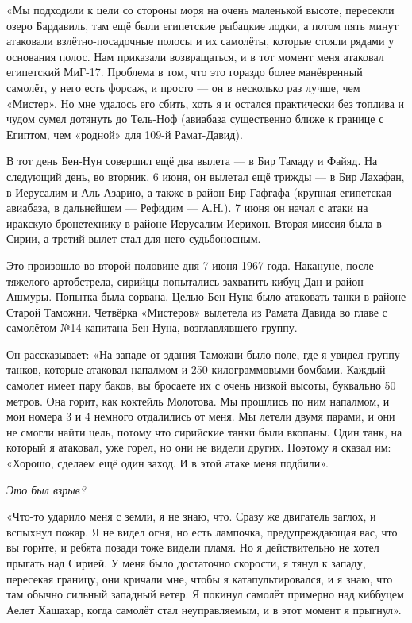 «Мы подходили к цели со стороны моря на очень маленькой высоте, пересекли озеро Бардавиль, там ещё были египетские рыбацкие лодки, а потом пять минут атаковали взлётно-посадочные полосы и их самолёты, которые стояли рядами у основания полос. Нам приказали возвращаться, и в тот момент меня атаковал египетский МиГ-17. Проблема в том, что это гораздо более манёвренный самолёт, у него есть форсаж, и просто — он в несколько раз лучше, чем «Мистер». Но мне удалось его сбить, хоть я и остался практически без топлива и чудом сумел дотянуть до Тель-Ноф (авиабаза существенно ближе к границе с Египтом, чем «родной» для 109-й Рамат-Давид).

В тот день Бен-Нун совершил ещё два вылета — в Бир Тамаду и Файяд. На следующий день, во вторник, 6 июня, он вылетал ещё трижды — в Бир Лахафан, в Иерусалим и Аль-Азарию, а также в район Бир-Гафгафа (крупная египетская авиабаза, в дальнейшем — Рефидим — А.Н.). 7 июня он начал с атаки на иракскую бронетехнику в районе Иерусалим-Иерихон. Вторая миссия была в Сирии, а третий вылет стал для него судьбоносным.

Это произошло во второй половине дня 7 июня 1967 года. Накануне, после тяжелого артобстрела, сирийцы попытались захватить кибуц Дан и район Ашмуры. Попытка была сорвана. Целью Бен-Нуна было атаковать танки в районе Старой Таможни. Четвёрка «Мистеров» вылетела из Рамата Давида во главе с самолётом №14 капитана Бен-Нуна, возглавлявшего группу.

Он рассказывает: «На западе от здания Таможни было поле, где я увидел группу танков, которые атаковал напалмом и 250-килограммовыми бомбами. Каждый самолет имеет пару баков, вы бросаете их с очень низкой высоты, буквально 50 метров. Она горит, как коктейль Молотова. Мы прошлись по ним напалмом, и мои номера 3 и 4 немного отдалились от меня. Мы летели двумя парами, и они не смогли найти цель, потому что сирийские танки были вкопаны. Один танк, на который я атаковал, уже горел, но они не видели других. Поэтому я сказал им: «Хорошо, сделаем ещё один заход. И в этой атаке меня подбили». 

\textit{Это был взрыв?}

«Что-то ударило меня с земли, я не знаю, что. Сразу же двигатель заглох, и вспыхнул пожар. Я не видел огня, но есть лампочка, предупреждающая вас, что вы горите, и ребята позади тоже видели пламя. Но я действительно не хотел прыгать над Сирией. У меня было достаточно скорости, я тянул к западу, пересекая границу, они кричали мне, чтобы я катапультировался, и я знаю, что там обычно сильный западный ветер. Я покинул самолёт примерно над киббуцем Аелет Хашахар, когда самолёт стал неуправляемым, и в этот момент я прыгнул».

